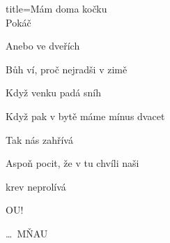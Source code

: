 \begin{song}{title=\centering Mám doma kočku\\\normalsize Pokáč \vspace*{-0.3cm}}
{\begin{minipage}[t]{0.5\textwidth}
   Anebo ve dveřích
   
   Bůh ví, proč nejradši v zimě
   
   Když venku padá sníh
   
   
\sloka
   Když pak v bytě máme mínus dvacet
   
   Tak nás zahřívá
   
   Aspoň pocit, že v tu chvíli naši
   
   krev neprolívá
   
   OU!
   
   
 \dots \, MŇAU
   
\end{minipage}   
}
\setcounter{Slokočet}{0}
\end{song}
